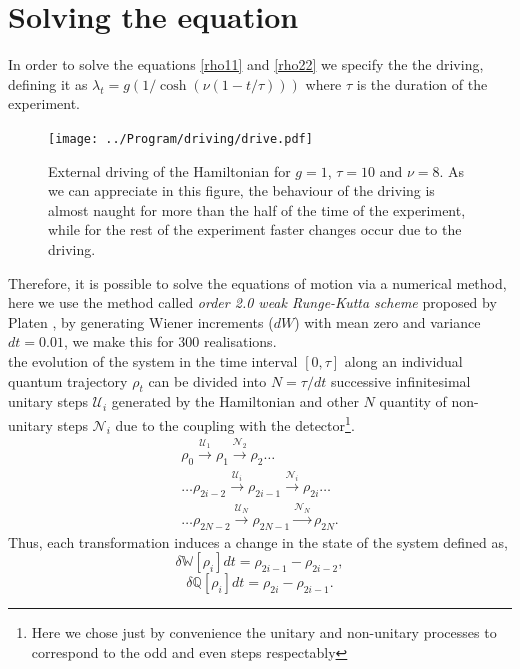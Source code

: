 \section{Solving the equation}
In order to solve the equations \eqref{rho11} and \eqref{rho22} we specify the the driving, defining it as  $\lambda_t=g(1/\cosh(\nu(1-t/\tau)))$ where $\tau$ is the duration of the experiment. 
\begin{figure}[h]
\centering
\texttt{[image: ../Program/driving/drive.pdf]}
\caption{External driving of the Hamiltonian for $g=1$, $\tau=10$ and $\nu=8$. As we can appreciate in this figure, the behaviour of the driving is almost naught for more than the half of the time of the experiment, while for the rest of the experiment faster changes occur due to the driving.}
\label{driving}
\end{figure}
Therefore, it is possible to solve the equations of motion via a numerical method, here we use the method called \textit{order 2.0 weak Runge-Kutta scheme} proposed by Platen \cite{Kloeden1992}, by generating Wiener increments ($dW$) with mean zero and variance $dt=0.01$, we make this for $300$ realisations.\\
the evolution of the system in the time interval $[0,\tau]$ along an individual quantum trajectory $\rho_t$ can be divided into $N=\tau/dt$ successive infinitesimal unitary steps $\mathcal{U}_{i}$ generated by the Hamiltonian and other $N$ quantity of non-unitary steps $\mathcal{N}_i$ due to the coupling with the detector\footnote{Here we chose just by convenience the unitary and non-unitary processes to correspond to the odd and even steps respectably}.
\begin{align}
\rho_0\xrightarrow{\mathcal{U}_1}\rho_1\xrightarrow{\mathcal{N}_2}\rho_{2}\ldots\nonumber\\
\ldots\rho_{2i-2}\xrightarrow{\mathcal{U}_i}\rho_{2i-1}\xrightarrow{\mathcal{N}_i}\rho_{2i}\ldots\nonumber\\
\ldots\rho_{2N-2}\xrightarrow{\mathcal{U}_N}\rho_{2N-1}\xrightarrow{\mathcal{N}_N}\rho_{2N}.
\end{align}
Thus, each transformation induces a change in the state of the system defined as,
\begin{equation}
\delta\mathbb{W}[\rho_{i}]dt=\rho_{2i-1}-\rho_{2i-2},
\label{changeofwork}
\end{equation} 
\begin{equation}
\delta\mathbb{Q}[\rho_{i}]dt=\rho_{2i}-\rho_{2i-1}.
\label{changeofheat}
\end{equation}
